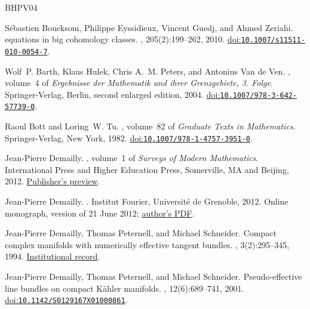 \documentclass[11pt,a4paper]{article}
\numberwithin{equation}{section}
\theoremstyle{definition}
\theoremstyle{remark}
\begin{document}

\begin{thebibliography}{BHPV04}

S{\'e}bastien Boucksom, Philippe Eyssidieux, Vincent Guedj, and Ahmed Zeriahi.
 equations in big cohomology classes.
, 205(2):199--262, 2010.
\newblock \href{https://doi.org/10.1007/s11511-010-0054-7}{doi:\nolinkurl{10.1007/s11511-010-0054-7}}.

Wolf~P. Barth, Klaus Hulek, Chris A.~M. Peters, and Antonius {Van de Ven}.
, volume~4 of {\em Ergebnisse der Mathematik und ihrer Grenzgebiete, 3. Folge}.
\newblock Springer-Verlag, Berlin, second enlarged edition, 2004.
\newblock \href{https://doi.org/10.1007/978-3-642-57739-0}{doi:\nolinkurl{10.1007/978-3-642-57739-0}}.

Raoul Bott and Loring~W. Tu.
, volume~82 of {\em Graduate Texts in Mathematics}.
\newblock Springer-Verlag, New York, 1982.
\newblock \href{https://doi.org/10.1007/978-1-4757-3951-0}{doi:\nolinkurl{10.1007/978-1-4757-3951-0}}.

Jean-Pierre Demailly.
, volume~1 of {\em Surveys of Modern Mathematics}.
\newblock International Press and Higher Education Press, Somerville, MA and Beijing, 2012.
\newblock \href{https://intlpress.com/site/pub/files/preview/bookpubs/00000371.pdf}{Publisher's preview}.

Jean-Pierre Demailly.
.
\newblock Institut Fourier, Universit{\'e} de Grenoble, 2012.
\newblock Online monograph, version of 21 June 2012; \href{https://www-fourier.univ-grenoble-alpes.fr/~demailly/manuscripts/agbook.pdf}{author's PDF}.

Jean-Pierre Demailly, Thomas Peternell, and Michael Schneider.
\newblock Compact complex manifolds with numerically effective tangent bundles.
, 3(2):295--345, 1994.
\newblock \href{https://eref.uni-bayreuth.de/id/eprint/59615/}{Institutional record}.

Jean-Pierre Demailly, Thomas Peternell, and Michael Schneider.
\newblock Pseudo-effective line bundles on compact {K\"ahler} manifolds.
, 12(6):689--741, 2001.
\newblock \href{https://doi.org/10.1142/S0129167X01000861}{doi:\nolinkurl{10.1142/S0129167X01000861}}.


\end{thebibliography}
\end{document}
